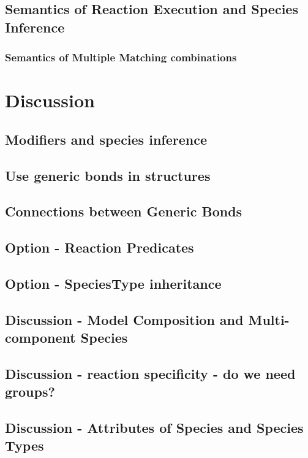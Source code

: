 \documentclass{cekarticle}
\begin{document}
\subsection{Semantics of Reaction Execution and Species Inference}

\subsubsection{Semantics of Multiple Matching combinations}

\clearpage
\section{Discussion}

\subsection{Modifiers and species inference}

\subsection{Use generic bonds in  structures}

\subsection{Connections between Generic Bonds}

\subsection{Option - Reaction Predicates}

\subsection{Option - SpeciesType inheritance}

\subsection{Discussion - Model Composition and Multi-component Species}

\subsection{Discussion - reaction specificity - do we need groups?}

\subsection{Discussion - Attributes of Species and Species Types}
\end{document}
